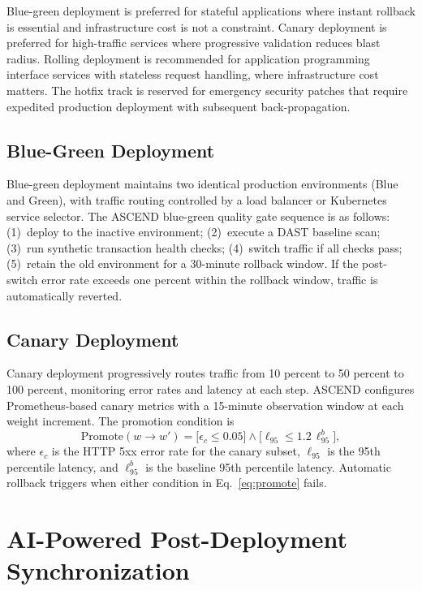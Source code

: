\documentclass{ieeeaccess}
\begin{document}
Blue-green deployment is preferred for stateful applications where instant rollback is essential and infrastructure cost is not a constraint. Canary deployment is preferred for high-traffic services where progressive validation reduces blast radius. Rolling deployment is recommended for application programming interface services with stateless request handling, where infrastructure cost matters. The hotfix track is reserved for emergency security patches that require expedited production deployment with subsequent back-propagation.

\subsection{Blue-Green Deployment}
Blue-green deployment maintains two identical production environments (Blue and Green), with traffic routing controlled by a load balancer or Kubernetes service selector. The ASCEND blue-green quality gate sequence is as follows: (1)~deploy to the inactive environment; (2)~execute a DAST baseline scan; (3)~run synthetic transaction health checks; (4)~switch traffic if all checks pass; (5)~retain the old environment for a 30-minute rollback window. If the post-switch error rate exceeds one percent within the rollback window, traffic is automatically reverted.

\subsection{Canary Deployment}
Canary deployment progressively routes traffic from 10 percent to 50 percent to 100 percent, monitoring error rates and latency at each step. ASCEND configures Prometheus-based canary metrics with a 15-minute observation window at each weight increment. The promotion condition is
\begin{equation}
\mathrm{Promote}(w \to w') = \bigl[\epsilon_c \leq 0.05\bigr] \wedge \bigl[\ell_{95} \leq 1.2\, \ell_{95}^{b}\bigr],
\label{eq:promote}
\end{equation}
where $\epsilon_c$ is the HTTP 5xx error rate for the canary subset, $\ell_{95}$ is the 95th percentile latency, and $\ell_{95}^{b}$ is the baseline 95th percentile latency. Automatic rollback triggers when either condition in Eq.~\eqref{eq:promote} fails.

\section{AI-Powered Post-Deployment Synchronization}
\label{sec:aisync}
\end{document}
